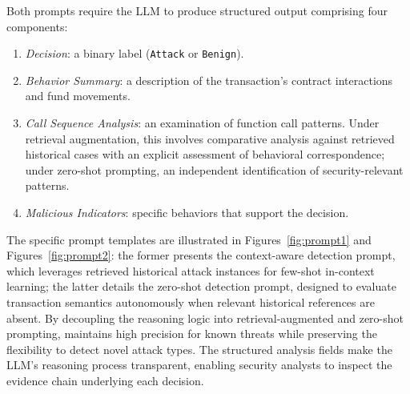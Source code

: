 
Both prompts require the LLM to produce structured output comprising four components:
\begin{enumerate}
    \item \textit{Decision}: a binary label (\texttt{Attack} or \texttt{Benign}).
    \item \textit{Behavior Summary}: a description of the transaction's contract interactions and fund movements.
    \item \textit{Call Sequence Analysis}: an examination of function call patterns. Under retrieval augmentation, this involves comparative analysis against retrieved historical cases with an explicit assessment of behavioral correspondence; under zero-shot prompting, an independent identification of security-relevant patterns.
    \item \textit{Malicious Indicators}: specific behaviors that support the decision.
\end{enumerate}


The specific prompt templates are illustrated in Figures~\ref{fig:prompt1} and Figures~\ref{fig:prompt2}: the former presents the context-aware detection prompt, which leverages retrieved historical attack instances for few-shot in-context learning; the latter details the zero-shot detection prompt, designed to evaluate transaction semantics autonomously when relevant historical references are absent.
By decoupling the reasoning logic into retrieval-augmented and zero-shot prompting, \approach{} maintains high precision for known threats while preserving the flexibility to detect novel attack types. The structured analysis fields make the LLM's reasoning process transparent, enabling security analysts to inspect the evidence chain underlying each decision.

